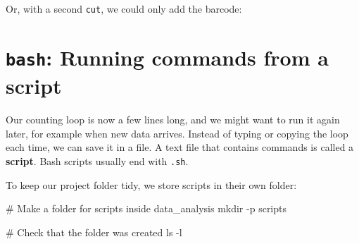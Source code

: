 \documentclass[
  letterpaper,
  DIV=11,
  numbers=noendperiod]{scrreprt}
\newenvironment{Shaded}{}{}
\newcommand{\AttributeTok}[1]{\textcolor[rgb]{0.84,0.23,0.29}{#1}}
\newcommand{\BuiltInTok}[1]{\textcolor[rgb]{0.84,0.23,0.29}{#1}}
\newcommand{\CommentTok}[1]{\textcolor[rgb]{0.42,0.45,0.49}{#1}}
\newcommand{\ControlFlowTok}[1]{\textcolor[rgb]{0.84,0.23,0.29}{#1}}
\newcommand{\FunctionTok}[1]{\textcolor[rgb]{0.44,0.26,0.76}{#1}}
\newcommand{\KeywordTok}[1]{\textcolor[rgb]{0.84,0.23,0.29}{#1}}
\newcommand{\NormalTok}[1]{\textcolor[rgb]{0.14,0.16,0.18}{#1}}
\newcommand{\OperatorTok}[1]{\textcolor[rgb]{0.14,0.16,0.18}{#1}}
\newcommand{\OtherTok}[1]{\textcolor[rgb]{0.44,0.26,0.76}{#1}}
\newcommand{\PreprocessorTok}[1]{\textcolor[rgb]{0.84,0.23,0.29}{#1}}
\newcommand{\StringTok}[1]{\textcolor[rgb]{0.01,0.18,0.38}{#1}}
\newcommand{\VariableTok}[1]{\textcolor[rgb]{0.89,0.38,0.04}{#1}}
\begin{document}
\begin{tcolorbox}
Or, with a second \texttt{cut}, we could only add the barcode:

\begin{Shaded}
\end{Shaded}

\end{tcolorbox}

\section{\texorpdfstring{\texttt{bash}: Running commands from a
script}{bash: Running commands from a script}}\label{bash-running-commands-from-a-script}

Our counting loop is now a few lines long, and we might want to run it
again later, for example when new data arrives. Instead of typing or
copying the loop each time, we can save it in a file. A text file that
contains commands is called a \textbf{script}. Bash scripts usually end
with \texttt{.sh}.

To keep our project folder tidy, we store scripts in their own folder:

\begin{Shaded}
\begin{Highlighting}[]
\CommentTok{\# Make a folder for scripts inside data\_analysis}
\FunctionTok{mkdir} \AttributeTok{{-}p}\NormalTok{ scripts}

\CommentTok{\# Check that the folder was created}
\FunctionTok{ls} \AttributeTok{{-}l}
\end{Highlighting}
\end{Shaded}
\end{document}
